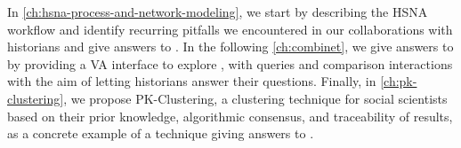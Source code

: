 In \autoref{ch:hsna-process-and-network-modeling}, we start by describing the HSNA workflow and identify recurring pitfalls we encountered in our collaborations with historians and give answers to \qone.
In the following \autoref{ch:combinet}, we give answers to \qtwo by providing a VA interface to explore \modelplural, with queries and comparison interactions with the aim of letting historians answer their questions.
Finally, in \autoref{ch:pk-clustering}, we propose PK-Clustering, a clustering technique for social scientists based on their prior knowledge, algorithmic consensus, and traceability of results, as a concrete example of a technique giving answers to \qthree.










%





